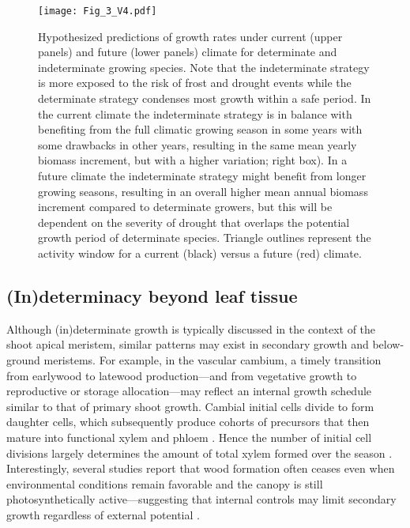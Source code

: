 \documentclass{article}
\begin{document}
	
								\begin{figure}
								\centering
								\texttt{[image: Fig\_3\_V4.pdf]} 
								\caption{Hypothesized predictions of growth rates under current (upper panels) and future (lower panels) climate for determinate and indeterminate growing species. Note that the indeterminate strategy is more exposed to the risk of frost and drought events while the determinate strategy condenses most growth within a safe period. In the current climate the indeterminate strategy is in balance with benefiting from the full climatic growing season in some years with some drawbacks in other years, resulting in the same mean yearly biomass increment, but with a higher variation; right box). In a future climate the indeterminate strategy might benefit from longer growing seasons, resulting in an overall higher mean annual biomass increment compared to determinate growers, but this will be dependent on the severity of drought that overlaps the potential growth period of determinate species. Triangle outlines represent the activity window for a current (black) versus a future (red) climate.}
								\label{fig:fig_4xxx}
							\end{figure}
	\pagebreak
	
	\subsection*{(In)determinacy beyond leaf tissue} 
	Although (in)determinate growth is typically discussed in the context of the shoot apical meristem, similar patterns may exist in secondary growth and below-ground meristems. For example, in the vascular cambium, a timely transition from earlywood to latewood production---and from vegetative growth to reproductive or storage allocation---may reflect an internal growth schedule similar to that of primary shoot growth. Cambial initial cells divide to form daughter cells, which subsequently produce cohorts of precursors that then mature into functional xylem and phloem \citep{valdovinos-ayalaSeasonalPatternsIncreases2022}. Hence the number of initial cell divisions largely determines the amount of total xylem formed over the season \citep{lupiXylemPhenologyWood2010}. Interestingly, several studies report that wood formation often ceases even when environmental conditions remain favorable and the canopy is still photosynthetically active—suggesting that internal controls may limit secondary growth regardless of external potential  \citep{buttoComparingCellDynamics2020, arendStemGrowthPhenology2024}.\\
	
\end{document}

